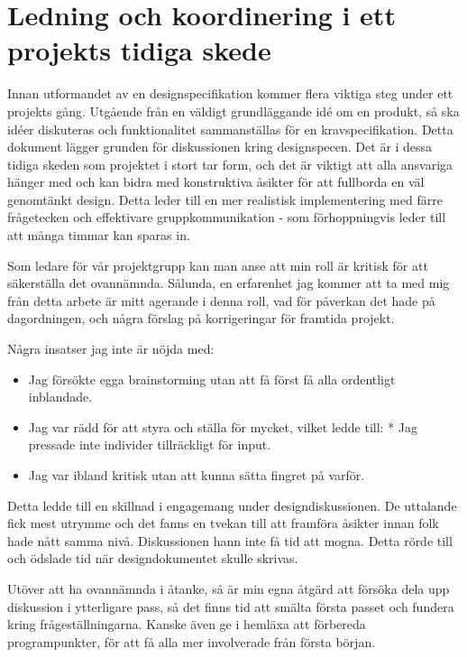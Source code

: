 ﻿\section{Ledning och koordinering i ett projekts tidiga skede}

Innan utformandet av en designspecifikation kommer flera viktiga steg under ett projekts gång. Utgående från en väldigt grundläggande idé om en produkt, så ska idéer diskuteras och funktionalitet sammanställas för en kravspecifikation. Detta dokument lägger grunden för diskussionen kring designspecen. Det är i dessa tidiga skeden som projektet i stort tar form, och det är viktigt att alla ansvariga hänger med och kan bidra med konstruktiva åsikter för att fullborda en väl genomtänkt design. Detta leder till en mer realistisk implementering med färre frågetecken och effektivare gruppkommunikation - som förhoppningvis leder till att många timmar kan sparas in.

Som ledare för vår projektgrupp kan man anse att min roll är kritisk för att säkerställa det ovannämnda. Sålunda, en erfarenhet jag kommer att ta med mig från detta arbete är mitt agerande i denna roll, vad för påverkan det hade på dagordningen, och några förslag på korrigeringar för framtida projekt.

Några insatser jag inte är nöjda med:
\begin{itemize}
\item Jag försökte egga brainstorming utan att få först få alla ordentligt inblandade.
\item Jag var rädd för att styra och ställa för mycket, vilket ledde till:
	* Jag pressade inte individer tillräckligt för input.
\item Jag var ibland kritisk utan att kunna sätta fingret på varför.
\end{itemize}
Detta ledde till en skillnad i engagemang under designdiskussionen. De uttalande fick mest utrymme
och det fanns en tvekan till att framföra åsikter innan folk hade nått samma nivå.
Diskussionen hann inte få tid att mogna. Detta rörde till och ödslade tid när
designdokumentet skulle skrivas.

Utöver att ha ovannämnda i åtanke, så är min egna åtgärd att försöka dela upp diskussion i ytterligare pass,
så det finns tid att smälta första passet och fundera kring frågeställningarna. Kanske även ge i hemläxa
att förbereda programpunkter, för att få alla mer involverade från första början.


